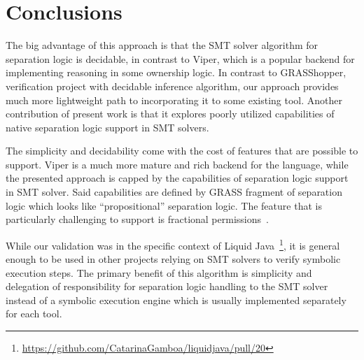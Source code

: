 \documentclass[sigplan,screen,review]{acmart}
\begin{document}


\section{Conclusions}

The big advantage of this approach is that the SMT solver algorithm for separation logic is decidable, in contrast to Viper\cite{DBLP:conf/vmcai/0001SS16}, which is a popular backend for implementing reasoning in some ownership logic. In contrast to GRASShopper\cite{piskac2014grasshopper}, verification project with decidable inference algorithm, our approach provides much more lightweight path to incorporating it to some existing tool. Another contribution of present work is that it explores poorly utilized capabilities of native separation logic support in SMT solvers. 


The simplicity and decidability come with the cost of features that are possible to support. Viper is a much more mature and rich backend for the language, while the presented approach is capped by the capabilities of separation logic support in SMT solver. Said capabilities are defined by GRASS fragment of separation logic which looks like ``propositional'' separation logic. The feature that is particularly challenging to support is fractional permissions~\cite{DBLP:conf/sas/Boyland03}. 

While our validation was in the specific context of Liquid Java~\cite{gamboa2021user}\footnote{\url{https://github.com/CatarinaGamboa/liquidjava/pull/20}}, it is general enough to be used in other projects relying on SMT solvers to verify symbolic execution steps. The primary benefit of this algorithm is simplicity and delegation of responsibility for separation logic handling to the SMT solver instead of a symbolic execution engine which is usually implemented separately for each tool. 




\end{document}
